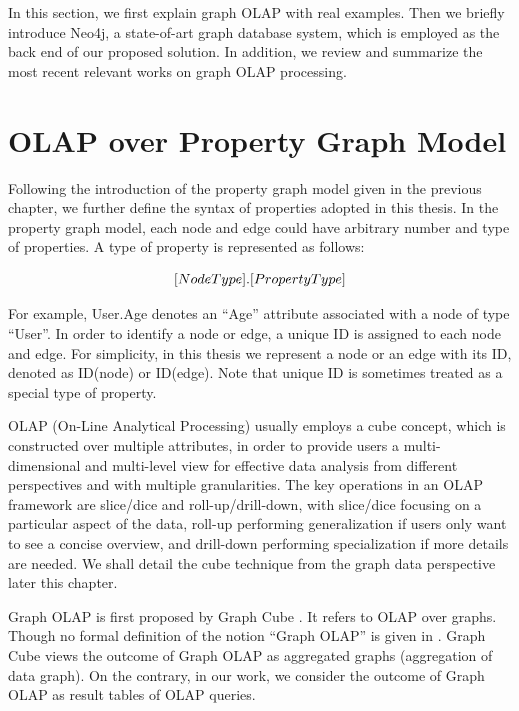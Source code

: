 In this section, we first explain graph OLAP with real examples. Then we briefly introduce Neo4j, a state-of-art graph database system, which is employed as the back end of our proposed solution. In addition, we review and summarize the most recent relevant works on graph OLAP processing.


\section{OLAP over Property Graph Model}


Following the introduction of the property graph model given in the previous chapter, we further define the syntax of properties adopted in this thesis. In the property graph model, each node and edge could have arbitrary number and type of properties. A type of property is represented as follows:

\begin{displaymath}
\centering
[NodeType].[PropertyType]
\end{displaymath}

For example, User.Age denotes an ``Age'' attribute associated with a node of type ``User''. In order to identify a node or edge, a unique ID is assigned to each node and edge.  For simplicity, in this thesis we represent a node or an edge with its ID, denoted as ID(node) or ID(edge). Note that unique ID is sometimes treated as a special type of property.


OLAP (On-Line Analytical Processing) \cite{DBLP:conf/sigmod/BeyerR99, DBLP:journals/datamine/GrayCBLRVPP97, DBLP:conf/sigmod/ZhaoDN97} usually employs a cube concept, which is constructed over multiple attributes, in order to provide users a multi-dimensional and multi-level view for effective data analysis from different perspectives and with multiple granularities. The key operations in an OLAP framework are slice/dice and roll-up/drill-down, with slice/dice focusing on a particular aspect of the data, roll-up performing generalization if users only want to see a concise overview, and drill-down performing specialization if more details are needed. We shall detail the cube technique from the graph data perspective later this chapter.

 Graph OLAP is first proposed by Graph Cube \cite{DBLP:conf/sigmod/ZhaoLXH11}. It refers to OLAP over graphs. Though no formal definition of the notion ``Graph OLAP'' is given in \cite{DBLP:conf/sigmod/ZhaoLXH11}. Graph Cube \cite{DBLP:conf/sigmod/ZhaoLXH11} views the outcome of Graph OLAP as aggregated graphs (aggregation of data graph). On the contrary, in our work, we consider the outcome of Graph OLAP as result tables of OLAP queries.

